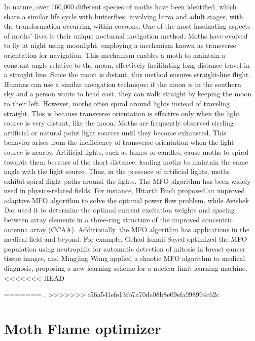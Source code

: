 \documentclass[conference]{IEEEtran}
\begin{document}
In nature, over 160,000 different species of moths have been identified, which share a similar life cycle with butterflies, involving larva and adult stages, with the transformation occurring within cocoons. One of the most fascinating aspects of moths’ lives is their unique nocturnal navigation method. Moths have evolved to fly at night using moonlight, employing a mechanism known as transverse orientation for navigation. This mechanism enables a moth to maintain a constant angle relative to the moon, effectively facilitating long-distance travel in a straight line. Since the moon is distant, this method ensures straight-line flight. Humans can use a similar navigation technique: if the moon is in the southern sky and a person wants to head east, they can walk straight by keeping the moon to their left. However, moths often spiral around lights instead of traveling straight. This is because transverse orientation is effective only when the light source is very distant, like the moon. Moths are frequently observed circling artificial or natural point light sources until they become exhausted. This behavior arises from the inefficiency of transverse orientation when the light source is nearby. Artificial lights, such as lamps or candles, cause moths to spiral towards them because of the short distance, leading moths to maintain the same angle with the light source. Thus, in the presence of artificial lights, moths exhibit spiral flight paths around the lights.
The MFO algorithm has been widely used in physics-related fields. For instance, Hitarth Buch proposed an improved adaptive MFO algorithm to solve the optimal power flow problem, while Avishek Das used it to determine the optimal current excitation weights and spacing between array elements in a three-ring structure of the improved concentric antenna array (CCAA). Additionally, the MFO algorithm has applications in the medical field and beyond. For example, Gehad Ismail Sayed optimized the MFO population using neutrophils for automatic detection of mitosis in breast cancer tissue images, and Mingjing Wang applied a chaotic MFO algorithm to medical diagnosis, proposing a new learning scheme for a nuclear limit learning machine.
<<<<<<< HEAD

=======
.
>>>>>>> f56a541efe13fb7a70de08b8e09efa998994c62c
\section{Moth Flame optimizer}
\end{document}
